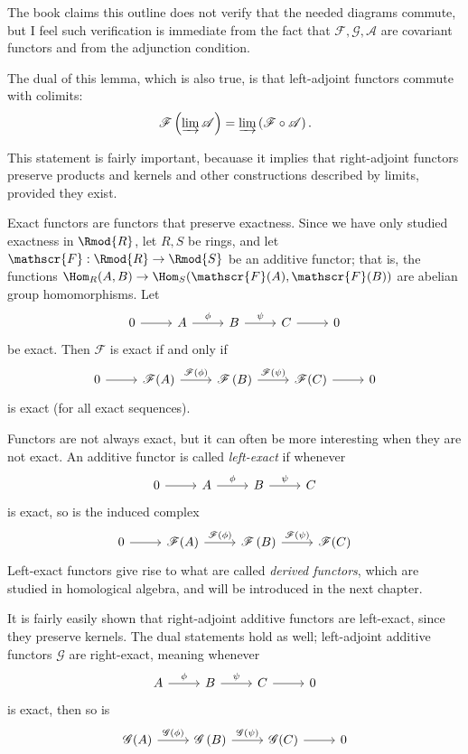 The book claims this outline does not verify that the needed diagrams commute, but I feel such verification is immediate from the fact that $\mathscr{F} ,\mathscr{G} ,\mathscr{A} $ are covariant functors and from the adjunction condition.

The dual of this lemma, which is also true, is that left-adjoint functors commute with colimits:
\[
	\mathscr{F} \left( \varinjlim \mathscr{A}  \right) =\varinjlim \left( \mathscr{F} \circ \mathscr{A}  \right) 
.\]

This statement is fairly important, becauase it implies that right-adjoint functors preserve products and kernels and other constructions described by limits, provided they exist.

Exact functors are functors that preserve exactness. Since we have only studied exactness in $\Rmod{R} $, let $R,S$ be rings, and let $\mathscr{F} : \Rmod{R}  \to \Rmod{S} $ be an additive functor; that is, the functions $\Hom_{R}(A, B) \to \Hom_{S}(\mathscr{F} (A), \mathscr{F} (B)) $ are abelian group homomorphisms. Let
\[\begin{tikzcd}[row sep = 2.5em, column sep = 2.5em]
	0\arrow[r]&A\arrow[r, "\phi  "]&B\arrow[r, "\psi "]&C\arrow[r]&0
\end{tikzcd}\]
be exact. Then $\mathscr{F} $ is exact if and only if
\[\begin{tikzcd}[row sep = 2.5em, column sep = 2.5em]
	0\arrow[r]&\mathscr{F} (A)\arrow[r, "\mathscr{F} (\phi )"]&\mathscr{F} \left( B \right) \arrow[r, "\mathscr{F} (\psi )"]&\mathscr{F} (C)\arrow[r]&0
\end{tikzcd}\]
is exact (for all exact sequences).

Functors are not always exact, but it can often be more interesting when they are not exact. An additive functor is called \emph{left-exact} if whenever
\[\begin{tikzcd}[row sep = 2.5em, column sep = 2.5em]
	0\arrow[r]&A\arrow[r, "\phi  "]&B\arrow[r, "\psi "]&C
\end{tikzcd}\]
is exact, so is the induced complex
\[\begin{tikzcd}[row sep = 2.5em, column sep = 2.5em]
	0\arrow[r]&\mathscr{F} (A)\arrow[r, "\mathscr{F} (\phi )"]&\mathscr{F} \left( B \right) \arrow[r, "\mathscr{F} (\psi )"]&\mathscr{F} (C)
\end{tikzcd}\]
Left-exact functors give rise to what are called \emph{derived functors}, which are studied in homological algebra, and will be introduced in the next chapter.

It is fairly easily shown that right-adjoint additive functors are left-exact, since they preserve kernels. The dual statements hold as well; left-adjoint additive functors $\mathscr{G} $ are right-exact, meaning whenever
\[\begin{tikzcd}[row sep = 2.5em, column sep = 2.5em]
	A\arrow[r, "\phi  "]&B\arrow[r, "\psi "]&C\arrow[r]&0
\end{tikzcd}\]
is exact, then so is
\[\begin{tikzcd}[row sep = 2.5em, column sep = 2.5em]
	\mathscr{G} (A)\arrow[r, "\mathscr{G} (\phi )"]&\mathscr{G} \left( B \right) \arrow[r, "\mathscr{G} (\psi )"]&\mathscr{G} (C)\arrow[r]&0
\end{tikzcd}\]
